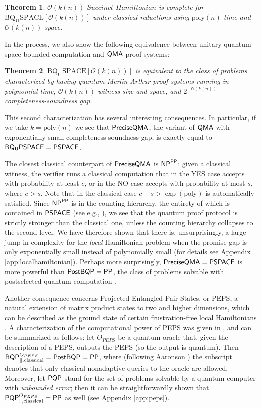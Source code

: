 \documentclass[11pt]{article}
\newtheorem{theorem}{Theorem}
\theoremstyle{definition}
\theoremstyle{remark}
\newcommand\QMA{{\sf{QMA}}}
\newcommand\PSPACE{{\sf{PSPACE}}}
\newcommand\BQPSPACE{{\sf{BQ_{U}PSPACE}}}
\newcommand\PP{\sf{PP}}
\newcommand\NP{{\sf{NP}}}
\newcommand\BQP{{\sf{BQP}}}
\newcommand\PostBQP{{\sf{PostBQP}}}
\newcommand\PQP{{\sf{PQP}}}
\newcommand\QMAexp{\sf{PreciseQMA}}
\newcommand\spechamiltonian[1]{#1\textit{-Succinct Hamiltonian}}
\newcommand{\classfont}{\mathrm}
\newcommand{\Unitary}{\mathbf{U}}
\newcommand{\unitaryBQSPACE}[1]{\classfont{BQ}_\Unitary\classfont{SPACE}[#1]}
\newcommand{\poly}{\textrm{poly}}
\begin{document}
\begin{theorem}
$\spechamiltonian{\mathcal{O}(k(n))}$ is complete for $\unitaryBQSPACE{\mathcal{O}(k(n))}$ under classical reductions using $\poly(n)$ time and $\mathcal{O}(k(n))$ space.
\end{theorem}

In the process, we also show the following equivalence between unitary quantum space-bounded computation and $\QMA$-proof systems:
\begin{theorem}
$\unitaryBQSPACE{\mathcal{O}(k(n))}$ is equivalent to the class of problems characterized by having quantum Merlin Arthur proof systems running in polynomial time, $\mathcal{O}(k(n))$ witness size and space, and $2^{-\mathcal{O}(k(n))}$ completeness-soundness gap.
\end{theorem}

This second characterization has several interesting consequences.  In particular, if we take $k = \poly(n)$ we see that $\QMAexp$, the variant of $\QMA$ with exponentially small completeness-soundness gap, is exactly equal to $\BQPSPACE=\PSPACE$.  

The closest classical counterpart of $\QMAexp$ is $\NP^{\PP}$: given a classical witness, the verifier runs a classical computation that in the YES case accepts with probability at least $c$, or in the NO case accepts with probability at most $s$, where $c>s$. Note that in the classical case $c - s > \exp(\poly)$ is automatically satisfied. Since $\NP^{\PP}$ is in the counting hierarchy, the entirety of which is contained in $\PSPACE$ (see e.g., \cite{allenderwagner}), we see that the quantum proof protocol is strictly stronger than the classical one, unless the counting hierarchy collapses to the second level.
We have therefore shown that there is, unsurprisingly, a large jump in complexity for the \emph{local} Hamiltonian problem when the promise gap is only exponentially small instead of polynomially small (for details see Appendix \ref{app:localhamiltonian}). Perhaps more surprisingly, $\QMAexp = \PSPACE$ is more powerful than $\PostBQP=\PP$, the class of problems solvable with postselected quantum computation \cite{aaronson05}.

Another consequence concerns Projected Entangled Pair States, or PEPS, a natural extension of matrix product states to two and higher dimensions, which can be described as the ground state of certain frustration-free local Hamiltonians \cite{vc04}. A characterization of the computational power of PEPS was given in \cite{swv07}, and can be summarized as follows: let $O_{PEPS}$ be a quantum oracle that, given the description of a PEPS, outputs the PEPS (so the output is quantum). Then $\BQP^{O_{PEPS}}_{\parallel,\text{classical}} = \PostBQP = \PP$, where (following Aaronson \cite{aaronson05}) the subscript  denotes that only classical nonadaptive queries to the oracle are allowed. Moreover, let $\PQP$ stand for the set of problems solvable by a quantum computer with \emph{unbounded error}; then it can be straightforwardly shown that $\PQP^{O_{PEPS}}_{\parallel,\text{classical}} = \PP$ as well (see Appendix \ref{app:peps}).
\end{document}
